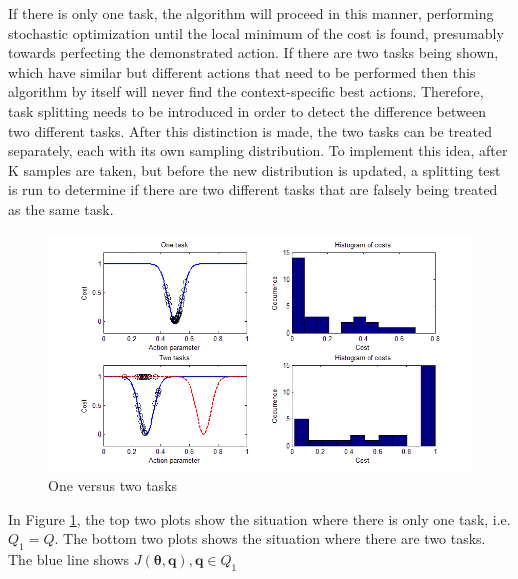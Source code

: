 \documentclass[12pt]{article}
\newcommand{\taskp}  {\ensuremath{\mathbf{q}}}
\newcommand{\costf}  {\ensuremath{J}}
\newcommand{\app}    {\ensuremath{\bm{\theta}}}
\newcommand{\taskpsp}{\ensuremath{Q}}
\begin{document}
If there is only one task, the algorithm will proceed in this manner, performing stochastic optimization until the local minimum of the cost is found, presumably towards perfecting the demonstrated action. If there are two tasks being shown, which have similar but different actions that need to be performed then this algorithm by itself will never find the context-specific best actions. Therefore, task splitting needs to be introduced in order to detect the difference between two different tasks. After this distinction is made, the two tasks can be treated separately, each with its own sampling distribution. To implement this idea, after K samples are taken, but before the new distribution is updated, a splitting test is run to determine if there are two different tasks that are falsely being treated as the same task.

\begin{figure}[ht]
  \centering
  \includegraphics[width=0.9\columnwidth]{one_vs_two_tasks.png}
  \caption{One versus two tasks}
  \label{fig:1vs2tasks}
\end{figure} 

In Figure \ref{fig:1vs2tasks}, the top two plots show the situation where there is only one task, i.e. $\taskpsp_1 = \taskpsp$. The bottom two plots shows the situation where there are two tasks. The blue line shows $\costf(\app,\taskp), \taskp \in \taskpsp_1$
\end{document}
